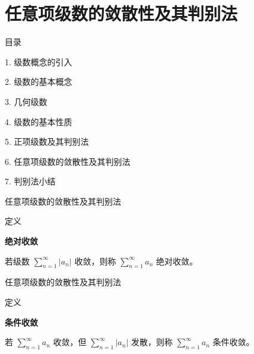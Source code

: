 \documentclass[aspectratio=169,10pt,fontset=fandol]{ctexbeamer}
\begin{document}
\section{任意项级数的敛散性及其判别法}
\begin{frame}[t,fragile]{目录}
\normalsize
{\color{black}\normalsize 1. 级数概念的引入\par}\vspace{0.3em}
{\color{black}\normalsize 2. 级数的基本概念\par}\vspace{0.3em}
{\color{black}\normalsize 3. 几何级数\par}\vspace{0.3em}
{\color{black}\normalsize 4. 级数的基本性质\par}\vspace{0.3em}
{\color{black}\normalsize 5. 正项级数及其判别法\par}\vspace{0.3em}
{\color{blue}\normalsize 6. 任意项级数的敛散性及其判别法\par}\vspace{0.3em}
{\color{gray!40}\normalsize 7. 判别法小结\par}\vspace{0.3em}
\end{frame}
\begin{frame}[t,fragile]{任意项级数的敛散性及其判别法}
\footnotesize
\begin{block}{定义}
{\footnotesize
\textbf{绝对收敛}\par

	若级数 \(\sum\limits_{n = 1}^{  \infty } |a_n|\) 收敛，则称 \(\sum\limits_{n = 1}^{  \infty } a_n\) 绝对收敛。

}
\end{block}
\end{frame}
\begin{frame}[t,fragile]{任意项级数的敛散性及其判别法}
\footnotesize
\begin{block}{定义}
{\footnotesize
\textbf{条件收敛}\par

	若 \(\sum\limits_{n = 1}^{  \infty } a_n\) 收敛，但 \(\sum\limits_{n = 1}^{  \infty } |a_n|\) 发散，则称 \(\sum\limits_{n = 1}^{  \infty } a_n\) 条件收敛。

}
\end{block}
\end{frame}
\end{document}

